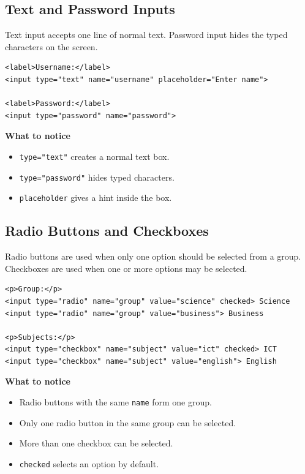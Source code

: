 \subsection{Text and Password Inputs}
Text input accepts one line of normal text. Password input hides the typed characters on the screen.

\begin{lstlisting}[style=htmlide, caption={Text and Password Fields}]
<label>Username:</label>
<input type="text" name="username" placeholder="Enter name">

<label>Password:</label>
<input type="password" name="password">
\end{lstlisting}

\textbf{What to notice}
\begin{itemize}
    \item \texttt{type="text"} creates a normal text box.
    \item \texttt{type="password"} hides typed characters.
    \item \texttt{placeholder} gives a hint inside the box.
\end{itemize}

\subsection{Radio Buttons and Checkboxes}
Radio buttons are used when only one option should be selected from a group. Checkboxes are used when one or more options may be selected.

\begin{lstlisting}[style=htmlide, caption={Radio and Checkbox Inputs}]
<p>Group:</p>
<input type="radio" name="group" value="science" checked> Science
<input type="radio" name="group" value="business"> Business

<p>Subjects:</p>
<input type="checkbox" name="subject" value="ict" checked> ICT
<input type="checkbox" name="subject" value="english"> English
\end{lstlisting}

\textbf{What to notice}
\begin{itemize}
    \item Radio buttons with the same \texttt{name} form one group.
    \item Only one radio button in the same group can be selected.
    \item More than one checkbox can be selected.
    \item \texttt{checked} selects an option by default.
\end{itemize}

